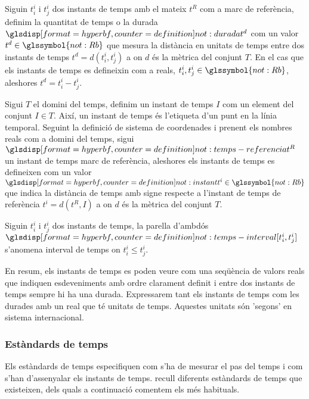 \begin{definition}[Temps]
  \label{def:model:temps}
  Siguin $t^i_i$ i $t^i_j$ dos instants de temps amb el mateix $t^R$
  com a marc de referència, definim la quantitat de temps o la durada
  $\glsdispdef{not:durada}{t^d}$ com un valor $t^d \in\glssymbol{not:Rb}$ que
  mesura la distància en unitats de temps entre dos instants de temps
  $t^d = d(t^i_i,t^i_j)$ a on $d$ és la mètrica del conjunt $T$. En el
  cas que els instants de temps es defineixin com a reals, $t^i_i ,
  t^i_j \in \glssymbol{not:Rb}$, aleshores $t^d = t^i_i - t^i_j$.

  Sigui $T$ el domini del temps, definim un instant de temps $I$ com
  un element del conjunt $I \in T$. Així, un instant de temps és
  l'etiqueta d'un punt en la línia temporal. Seguint la definició de
  sistema de coordenades i prenent els nombres reals com a domini del
  temps, sigui $\glsdispdef{not:temps-referencia}{t^{R}}$ un instant de temps
  marc de referència, aleshores els instants de temps es defineixen
  com un valor $\glsdispdef{not:instant}{t^i} \in\glssymbol{not:Rb}$
  que indica la distància de temps amb signe respecte a l'instant de
  temps de referència $t^i= d(t^{R},I)$ a on $d$ és la mètrica del
  conjunt $T$.

  Siguin $t^i_i$ i $t^i_j$ dos instants de temps, la parella d'ambdós
  $\glsdispdef{not:temps-interval}{[t^i_i,t^i_j]}$ s'anomena interval de
  temps on $t^i_i \leq t^i_j$.
\end{definition}

En resum, els instants de temps es poden veure com una seqüència de
valors reals que indiquen esdeveniments amb ordre clarament definit i
entre dos instants de temps sempre hi ha una durada. Expressarem tant
els instants de temps com les durades amb un real que té unitats de
temps. Aquestes unitats són 'segons' en sistema internacional.




\subsubsection{Estàndards de temps}

Els estàndards de temps especifiquen com s'ha de mesurar el pas del
temps i com s'han d'assenyalar els instants de temps.
\textcite{allen:timescales} recull diferents estàndards de temps
que existeixen, dels quals a continuació comentem els més habituals.

